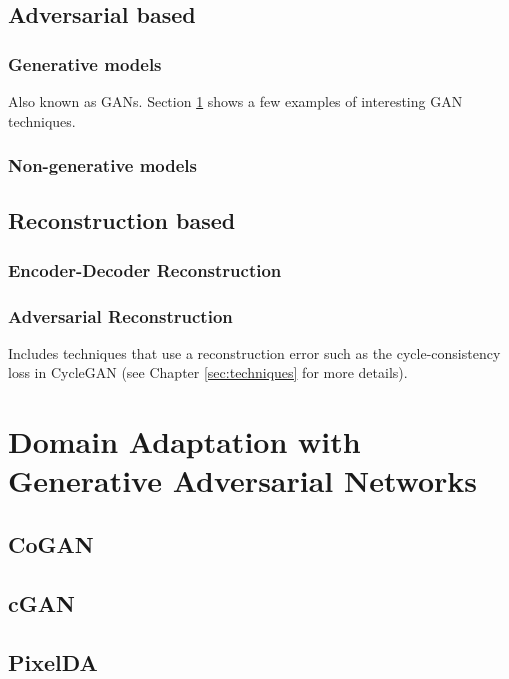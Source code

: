 \subsection{Adversarial based}

\subsubsection{Generative models}
Also known as GANs. Section \ref{sec:DA_with_GANs} shows a few examples of interesting GAN techniques.

\subsubsection{Non-generative models}


\subsection{Reconstruction based}

\subsubsection{Encoder-Decoder Reconstruction}

\subsubsection{Adversarial Reconstruction}
Includes techniques that use a reconstruction error such as the cycle-consistency loss in CycleGAN (see Chapter \ref{sec:techniques} for more details).





\section{Domain Adaptation with Generative Adversarial Networks}
\label{sec:DA_with_GANs}
\subsection{CoGAN}
\cite{DBLP:journals/corr/0001T16}

\subsection{cGAN}
\cite{DBLP:journals/corr/IsolaZZE16}

\subsection{PixelDA}
\cite{DBLP:journals/corr/BousmalisSDEK16}